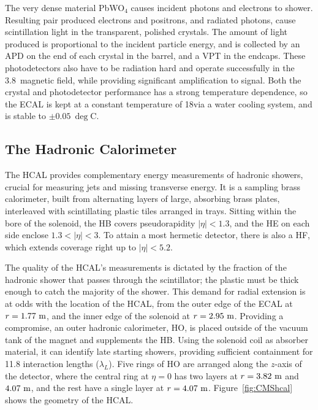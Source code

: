 The very dense material PbWO$_{4}$ causes incident photons and electrons to shower. 
Resulting pair produced electrons and positrons, and radiated photons, cause scintillation light in the transparent, polished crystals. 
The amount of light produced is proportional to the incident particle energy, and is collected by an \ac{APD} on the end of each crystal in the barrel, and a \ac{VPT} in the endcaps.
These photodetectors also have to be radiation hard and operate successfully in the 3.8~\T magnetic field, while providing significant amplification to signal.
Both the crystal and photodetector performance has a strong temperature dependence, so the \ac{ECAL} is kept at a constant temperature of 18\deg via a water cooling system, and is stable to $\pm0.05~\deg$C.







\subsection{The Hadronic Calorimeter}
The \ac{HCAL} provides complementary energy measurements of hadronic showers, crucial for measuring jets and missing transverse energy.
It is a sampling brass calorimeter, built from alternating layers of large, absorbing brass plates, interleaved with scintillating plastic tiles arranged in trays. 
Sitting within the bore of the solenoid, the \ac{HB} covers pseudorapidity $|\eta|<1.3$,
and the \ac{HE} on each side enclose $1.3<|\eta|<3$.
To attain a most hermetic detector, there is also a \ac{HF}, which extends coverage right up to $|\eta|<5.2$.

The quality of the \ac{HCAL}'s measurements is dictated by the fraction of the hadronic shower that passes through the scintillator; the plastic must be thick enough to catch the majority of the shower.
This demand for radial extension is at odds with the location of the \ac{HCAL}, from the outer edge of the \ac{ECAL} at $r=1.77~\mathrm{m}$, and the inner edge of the solenoid at $r=2.95~\mathrm{m}$.
Providing a compromise, an outer hadronic calorimeter, \ac{HO}, is placed outside of the vacuum tank of the magnet and supplements the \ac{HB}.
Using the solenoid coil as absorber material, it can identify late starting showers, providing sufficient containment for 11.8 interaction lengths ($\lambda_{L}$).
Five rings of \ac{HO} are arranged along the $z$-axis of the detector, where the central ring at $\eta=0$ has two layers at $r=3.82~\mathrm{m}$ and $4.07~\mathrm{m}$, and the rest have a single layer at $r=4.07~\mathrm{m}$. 
Figure~\ref{fig:CMShcal} shows the geometry of the \ac{HCAL}.

